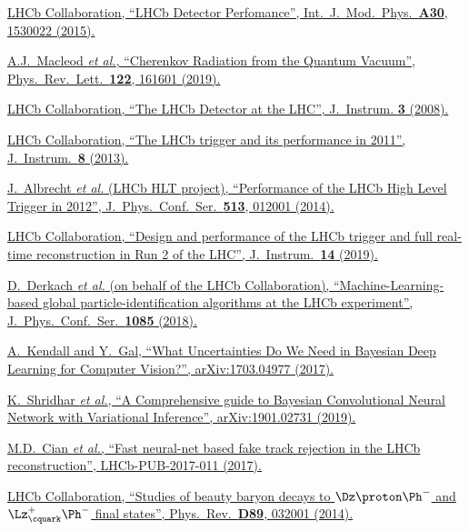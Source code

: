 \href{https://doi.org/10.1142/S0217751X15300227}{LHCb Collaboration, \enquote{LHCb Detector Perfomance}, Int.\ J.\ Mod.\ Phys.\ \textbf{A30}, 1530022 (2015).}

\href{https://doi.org/10.1103/PhysRevLett.122.161601}{A.J.~Macleod \textit{et al.}, \enquote{Cherenkov Radiation from the Quantum Vacuum}, Phys.\ Rev.\ Lett.\ \textbf{122}, 161601 (2019).}

\href{https://doi.org/10.1088/1748-0221/3/08/S08005}{LHCb Collaboration, \enquote{The LHCb Detector at the LHC}, J.\ Instrum. \textbf{3} (2008).}

\href{https://doi.org/10.1088/1748-0221/8/04/p04022}{LHCb Collaboration, \enquote{The LHCb trigger and its performance in 2011}, J.\ Instrum.\ \textbf{8} (2013).}

\href{https://doi.org/10.1088/1742-6596/513/1/012001}{J.~Albrecht \textit{et al.} (LHCb HLT project), \enquote{Performance of the LHCb High Level Trigger in 2012}, J.\ Phys.\ Conf.\ Ser.\ \textbf{513}, 012001 (2014).}

\href{https://doi.org/10.1088/1748-0221/14/04/P04013}{LHCb Collaboration, \enquote{Design and performance of the LHCb trigger and full real-time reconstruction in Run 2 of the LHC}, J.\ Instrum.\ \textbf{14} (2019).}

\href{https://doi.org/10.1088/1742-6596/1085/4/042038}{D.~Derkach \textit{et al.} (on behalf of the LHCb Collaboration), \enquote{Machine-Learning-based global particle-identification algorithms at the LHCb experiment}, J.\ Phys.\ Conf.\ Ser.\ \textbf{1085} (2018).}

\href{https://arxiv.org/abs/1703.04977}{A.~Kendall and Y.~Gal, \enquote{What Uncertainties Do We Need in Bayesian Deep Learning for Computer Vision?}, arXiv:1703.04977 (2017).}

\href{https://arxiv.org/abs/1901.02731}{K.~Shridhar \textit{et al.}, \enquote{A Comprehensive guide to Bayesian Convolutional Neural Network with Variational Inference}, arXiv:1901.02731 (2019).}

\href{https://cds.cern.ch/record/2255039/files/LHCb-PUB-2017-011.pdf}{M.D.~Cian \textit{et al.}, \enquote{Fast neural-net based fake track rejection in the LHCb reconstruction}, LHCb-PUB-2017-011 (2017).}

\href{https://doi.org/10.1103/PhysRevD.89.032001}{LHCb Collaboration, \enquote{Studies of beauty baryon decays to $\Dz\proton\Ph^-$ and $\Lz^+_\cquark\Ph^-$ final states}, Phys.\ Rev.\ \textbf{D89}, 032001 (2014).}

